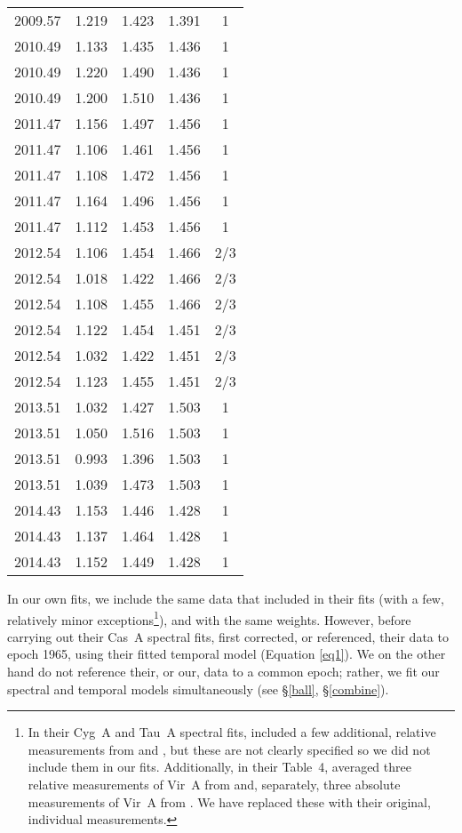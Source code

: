 \documentclass[fleqn,usenatbib]{mnras}
\begin{document}
\begin{table}
\begin{tabular}{c c c c c}
2009.57	&	1.219	&	1.423	&	1.391	&	1	\\
2010.49	&	1.133	&	1.435	&	1.436	&	1	\\
2010.49	&	1.220	&	1.490	&	1.436	&	1	\\
2010.49	&	1.200	&	1.510	&	1.436	&	1	\\
2011.47	&	1.156	&	1.497	&	1.456	&	1	\\
2011.47	&	1.106	&	1.461	&	1.456	&	1	\\
2011.47	&	1.108	&	1.472	&	1.456	&	1	\\
2011.47	&	1.164	&	1.496	&	1.456	&	1	\\
2011.47	&	1.112	&	1.453	&	1.456	&	1	\\
2012.54	&	1.106	&	1.454	&	1.466	&	 2/3	\\
2012.54	&	1.018	&	1.422	&	1.466	&	 2/3	\\
2012.54	&	1.108	&	1.455	&	1.466	&	 2/3	\\
2012.54	&	1.122	&	1.454	&	1.451	&	 2/3	\\
2012.54	&	1.032	&	1.422	&	1.451	&	 2/3	\\
2012.54	&	1.123	&	1.455	&	1.451	&	 2/3	\\
2013.51	&	1.032	&	1.427	&	1.503	&	1	\\
2013.51	&	1.050	&	1.516	&	1.503	&	1	\\
2013.51	&	0.993	&	1.396	&	1.503	&	1	\\
2013.51	&	1.039	&	1.473	&	1.503	&	1	\\
2014.43	&	1.153	&	1.446	&	1.428	&	1	\\
2014.43	&	1.137	&	1.464	&	1.428	&	1	\\
2014.43	&	1.152	&	1.449	&	1.428	&	1	\\
\hline 
\end{tabular}
\end{table}

In our own fits, we include the same data that \citet{b77} included in their fits (with a few, relatively minor exceptions\footnote{In their Cyg~A and Tau~A spectral fits, \citet{b77} included a few additional, relative measurements from \citet{b72} and \citet{b65}, but these are not clearly specified so we did not include them in our fits.  Additionally, in their Table~4, \citet{b77} averaged three relative measurements of Vir~A from \citet{b72} and, separately, three absolute measurements of Vir~A from \citet{j74}.  We have replaced these with their original, individual measurements.}), and with the same weights.  However, before carrying out their Cas~A spectral fits, \citet{b77} first corrected, or referenced, their data to epoch 1965, using their fitted temporal model (Equation \ref{eq1}).  We on the other hand do not reference their, or our, data to a common epoch; rather, we fit our spectral and temporal models simultaneously (see \S\ref{ball}, \S\ref{combine}).
\end{document}
